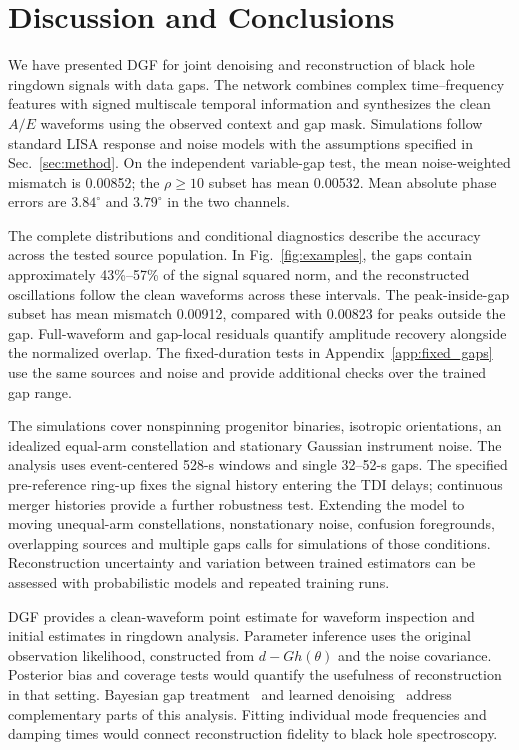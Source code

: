 \documentclass[10pt,prd,aps,a4paper,twocolumn,superscriptaddress,nofootinbib,floatfix]{revtex4-2}
\begin{document}
\section{Discussion and Conclusions}\label{sec:discussion}
We have presented DGF for joint denoising and reconstruction of black hole ringdown signals with data gaps. The network combines complex time--frequency features with signed multiscale temporal information and synthesizes the clean $A/E$ waveforms using the observed context and gap mask. Simulations follow standard LISA response and noise models with the assumptions specified in Sec.~\ref{sec:method}. On the independent variable-gap test, the mean noise-weighted mismatch is 0.00852; the $\rho\ge10$ subset has mean 0.00532. Mean absolute phase errors are $3.84^\circ$ and $3.79^\circ$ in the two channels.

The complete distributions and conditional diagnostics describe the accuracy across the tested source population. In Fig.~\ref{fig:examples}, the gaps contain approximately 43\%--57\% of the signal squared norm, and the reconstructed oscillations follow the clean waveforms across these intervals. The peak-inside-gap subset has mean mismatch 0.00912, compared with 0.00823 for peaks outside the gap. Full-waveform and gap-local residuals quantify amplitude recovery alongside the normalized overlap. The fixed-duration tests in Appendix~\ref{app:fixed_gaps} use the same sources and noise and provide additional checks over the trained gap range.

The simulations cover nonspinning progenitor binaries, isotropic orientations, an idealized equal-arm constellation and stationary Gaussian instrument noise. The analysis uses event-centered 528-s windows and single 32--52-s gaps. The specified pre-reference ring-up fixes the signal history entering the TDI delays; continuous merger histories provide a further robustness test. Extending the model to moving unequal-arm constellations, nonstationary noise, confusion foregrounds, overlapping sources and multiple gaps calls for simulations of those conditions. Reconstruction uncertainty and variation between trained estimators can be assessed with probabilistic models and repeated training runs.

DGF provides a clean-waveform point estimate for waveform inspection and initial estimates in ringdown analysis. Parameter inference uses the original observation likelihood, constructed from $d-Gh(\theta)$ and the noise covariance. Posterior bias and coverage tests would quantify the usefulness of reconstruction in that setting. Bayesian gap treatment~\cite{Baghi2019} and learned denoising~\cite{Wang:2024waveformer} address complementary parts of this analysis. Fitting individual mode frequencies and damping times would connect reconstruction fidelity to black hole spectroscopy.
\end{document}
